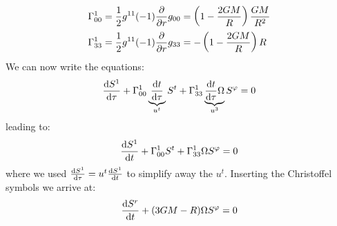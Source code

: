 \documentclass[../template.tex]{subfiles}
\begin{document}
\begin{example}
    \begin{align*}
        \Gamma_{00}^1 &= \frac{1}{2} g^{11} (-1)\pdv{r} g_{00} = \left(1- \frac{2GM}{R} \right)  \frac{GM}{R^2}    \\
        \Gamma^1_{33} &= \frac{1}{2} g^{11} (-1)\pdv{r} g_{33} = -\left(1-\frac{2GM}{R} \right) R
    \end{align*}
    We can now write the equations:
    \begin{align*}
        \dv{S^1}{\tau} + \Gamma^1_{00} \underbrace{\dv{t}{\tau}}_{u^t}  S^t + \Gamma^1_{33} \underbrace{\dv{t}{\tau} \Omega}_{u^3} S^\varphi = 0 
    \end{align*}
    leading to:
    \begin{align*}
        \dv{S^1}{t} + \Gamma_{00}^1 S^t + \Gamma^1_{33} \Omega S^\varphi = 0
    \end{align*}
    where we used $\dv{S^1}{\tau} = u^t \dv{S^1}{t}$ to simplify away the $u^t$. Inserting the Christoffel symbols we arrive at:
    \begin{align*}
        \dv{S^r}{t} + (3GM -R) \Omega S^\varphi = 0
    \end{align*}  

\end{example}
\end{document}
